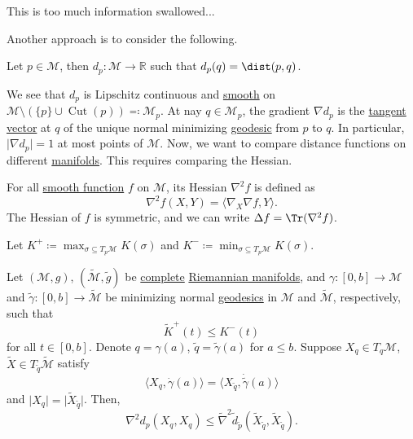 \begin{note}
	This is too much information swallowed...
\end{note}

Another approach is to consider the following.

\begin{notation}
	Let \(p\in \mathcal{M} \), then \(d_p \colon \mathcal{M} \to \mathbb{R} \) such that \(d_p(q) = \dist(p, q) \).
\end{notation}

We see that \(d_p\) is Lipschitz continuous and \hyperref[def:smooth-function]{smooth} on \(\mathcal{M} \setminus (\{ p \} \cup \operatorname{Cut}(p) ) \eqqcolon \mathcal{M} _p\). At nay \(q\in \mathcal{M} _p\), the gradient \(\nabla d_p\) is the \hyperref[def:tangent-vector]{tangent vector} at \(q\) of the unique normal minimizing \hyperref[def:geodesic]{geodesic} from \(p\) to \(q\). In particular, \(\vert \nabla d_p \vert = 1\) at most points of \(\mathcal{M} \). Now, we want to compare distance functions on different \hyperref[def:smooth-manifold]{manifolds}. This requires comparing the Hessian.

\begin{prev}[Hessian]
	For all \hyperref[def:smooth-function]{smooth function} \(f\) on \(\mathcal{M} \), its Hessian \(\nabla ^2 f\) is defined as
	\[
		\nabla ^2 f(X, Y) = \langle \nabla _X \nabla f, Y \rangle.
	\]
	The Hessian of \(f\) is symmetric, and we can write \(\Delta f = \Tr (\nabla ^2 f)\).
\end{prev}

\begin{notation}
	Let \(K^+ \coloneqq \max _{\sigma \subseteq T_p \mathcal{M} } K(\sigma )\) and \(K^- \coloneqq \min _{\sigma \subseteq T_p \mathcal{M} } K(\sigma )\).
\end{notation}

\begin{theorem}\label{thm:comparsion-Hessian}
	Let \((\mathcal{M} , g)\), \((\widetilde{\mathcal{M}} , \widetilde{g} )\) be \hyperref[def:geodesically-complete]{complete} \hyperref[def:Riemannian-manifold]{Riemannian manifolds}, and \(\gamma \colon [0, b] \to \mathcal{M} \) and \(\widetilde{\gamma} \colon [0, b] \to \widetilde{\mathcal{M}} \) be minimizing normal \hyperref[def:geodesic]{geodesics} in \(\mathcal{M} \) and \(\widetilde{\mathcal{M}} \), respectively, such that
	\[
		\widetilde{K} ^+ (t)\leq K^-(t)
	\]
	for all \(t\in [0, b]\). Denote \(q = \gamma (a)\), \(\widetilde{q} = \widetilde{\gamma} (a)\) for \(a \leq b\). Suppose \(X_q\in T_q \mathcal{M}\), \(\widetilde{X} \in T_{\widetilde{q} } \widetilde{\mathcal{M}} \) satisfy
	\[
		\langle X_q, \dot{\gamma } (a) \rangle = \langle X_{\widetilde{q} }, \dot{\widetilde{\gamma} } (a) \rangle
	\]
	and \(\vert X_q \vert = \vert \widetilde{X} _{\widetilde{q} } \vert \). Then,
	\[
		\nabla ^2 d_p(X_q, X_q) \leq \widetilde{\nabla} ^2 \widetilde{d} _{\widetilde{p} } (\widetilde{X} _{\widetilde{q} }, \widetilde{X} _{\widetilde{q} }).
	\]
\end{theorem}

